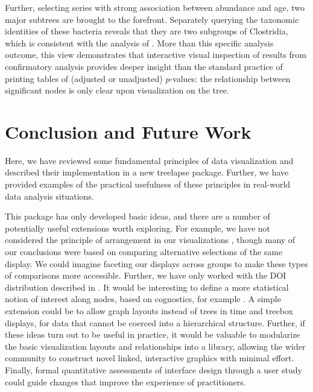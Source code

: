 \documentclass[12pt]{article}
\begin{document}
Further, selecting series with strong association between abundance and age, two
major subtrees are brought to the forefront. Separately querying the
taxonomic identities of these bacteria reveals that they are two subgroups of
Clostridia, which is consistent with the analysis of
\citep{callahan2016bioconductor}. More than this specific analysis outcome, this
view demonstrates that interactive visual inspection of results from
confirmatory analysis provides deeper insight than the standard practice of
printing tables of (adjusted or unadjusted) $p$-values: the relationship between
significant nodes is only clear upon visualization on the tree.

\section{Conclusion and Future Work}\label{conclusion}

Here, we have reviewed some fundamental principles of data visualization and
described their implementation in a new treelapse package. Further, we have
provided examples of the practical usefulness of these principles in real-world
data analysis situations.

This package has only developed basic ideas, and there are a number of
potentially useful extensions worth exploring. For example, we have not
considered the principle of arrangement in our visualizations
\citep{buja1996interactive}, though many of our conclusions were based on
comparing alternative selections of the same display. We could imagine faceting
our displays across groups to make these types of comparisons more accessible.
Further, we have only worked with the DOI distribution described in
\citep{heer2004doitrees}. It would be interesting to define a more statistical
notion of interest along nodes, based on cognostics, for example
\citep{hafen2013trelliscope, friedman2002john}. A simple extension could be to
allow graph layouts instead of trees in time and treebox displays, for data that
cannot be coerced into a hierarchical structure. Further, if these ideas turn
out to be useful in practice, it would be valuable to modularize the basic
visualization layouts and relationships into a library, allowing the wider
community to construct novel linked, interactive graphics with minimal effort.
Finally, formal quantitative assessments of interface design through a user
study could guide changes that improve the experience of practitioners.
\end{document}
